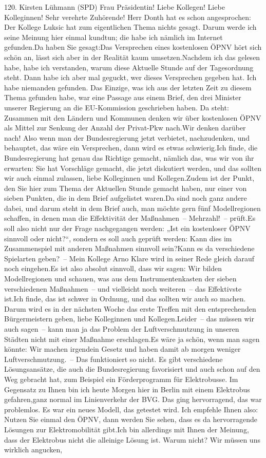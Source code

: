\documentclass{article}
\begin{document}
	120. Kirsten Lühmann (SPD) Frau Präsidentin! Liebe Kollegen! Liebe Kolleginnen! Sehr verehrte Zuhörende! Herr Donth hat es schon angesprochen: Der Kollege Luksic hat zum eigentlichen Thema nichts gesagt. Darum werde ich seine Meinung hier einmal kundtun; die habe ich nämlich im Internet gefunden.Da haben Sie gesagt:Das Versprechen eines kostenlosen ÖPNV hört sich schön an, lässt sich aber in der Realität kaum umsetzen.Nachdem ich das gelesen habe, habe ich verstanden, warum diese Aktuelle Stunde auf der Tagesordnung steht. Dann habe ich aber mal geguckt, wer dieses Versprechen gegeben hat. Ich habe niemanden gefunden. Das Einzige, was ich aus der letzten Zeit zu diesem Thema gefunden habe, war eine Passage aus einem Brief, den drei Minister unserer Regierung an die EU-Kommission geschrieben haben. Da steht: Zusammen mit den Ländern und Kommunen denken wir über kostenlosen ÖPNV als Mittel zur Senkung der Anzahl der Privat-Pkw nach.Wir denken darüber nach! Also wenn man der Bundesregierung jetzt verbietet, nachzudenken, und behauptet, das wäre ein Versprechen, dann wird es etwas schwierig.Ich finde, die Bundesregierung hat genau das Richtige gemacht, nämlich das, was wir von ihr erwarten: Sie hat Vorschläge gemacht, die jetzt diskutiert werden, und das sollten wir auch einmal zulassen, liebe Kolleginnen und Kollegen.Zudem ist der Punkt, den Sie hier zum Thema der Aktuellen Stunde gemacht haben, nur einer von sieben Punkten, die in dem Brief aufgelistet waren.Da sind noch ganz andere dabei, und darum steht in dem Brief auch, man möchte gern fünf Modellregionen schaffen, in denen man die Effektivität der Maßnahmen – Mehrzahl! – prüft.Es soll also nicht nur der Frage nachgegangen werden: „Ist ein kostenloser ÖPNV sinnvoll oder nicht?“, sondern es soll auch geprüft werden: Kann dies im Zusammenspiel mit anderen Maßnahmen sinnvoll sein?Kann es da verschiedene Spielarten geben? – Mein Kollege Arno Klare wird in seiner Rede gleich darauf noch eingehen.Es ist also absolut sinnvoll, dass wir sagen: Wir bilden Modellregionen und schauen, was aus dem Instrumentenkasten der sieben verschiedenen Maßnahmen – und vielleicht noch weiteren – das Effektivste ist.Ich finde, das ist schwer in Ordnung, und das sollten wir auch so machen. Darum wird es in der nächsten Woche das erste Treffen mit den entsprechenden Bürgermeistern geben, liebe Kolleginnen und Kollegen.Leider – das müssen wir auch sagen – kann man ja das Problem der Luftverschmutzung in unseren Städten nicht mit einer Maßnahme erschlagen.Es wäre ja schön, wenn man sagen könnte: Wir machen irgendein Gesetz und haben damit ab morgen weniger Luftverschmutzung. – Das funktioniert so nicht. Es gibt verschiedene Lösungsansätze, die auch die Bundesregierung favorisiert und auch schon auf den Weg gebracht hat, zum Beispiel ein Förderprogramm für Elektrobusse. Im Gegensatz zu Ihnen bin ich heute Morgen hier in Berlin mit einem Elektrobus gefahren,ganz normal im Linienverkehr der BVG. Das ging hervorragend, das war problemlos. Es war ein neues Modell, das getestet wird. Ich empfehle Ihnen also: Nutzen Sie einmal den ÖPNV, dann werden Sie sehen, dass es da hervorragende Lösungen zur Elektromobilität gibt.Ich bin allerdings mit Ihnen der Meinung, dass der Elektrobus nicht die alleinige Lösung ist. Warum nicht? Wir müssen uns wirklich angucken, 
\end{document}
